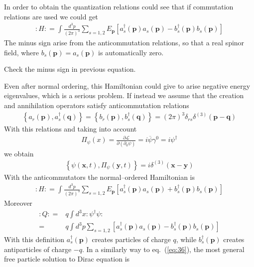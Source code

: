 \begin{frame}
In order to obtain the quantization relations could see that if commutation relations are used we could get
\begin{align}
  \colon\!H\colon=\int\frac{d^3p}{(2\pi)^3}\sum_{s=1,2}E_{\mathbf{p}}\left[a^\dagger_s(\mathbf{p})a_s(\mathbf{p})-b^\dagger_s(\mathbf{p})b_s(\mathbf{p})\right]
\end{align}
The minus sign arise from the anticommutation relations, so that a real spinor field, where $b_s(\mathbf{p})=a_s(\mathbf{p})$ is automatically zero.
\begin{inprogress}
  Check the minus sign in previous equation.
\end{inprogress}
Even after normal ordering, this Hamiltonian could give to arise negative energy eigenvalues, which is a serious problem. If instead we assume that the creation and annihilation operators satisfy anticommutation relations
\begin{align}
  \left\{a_r(\mathbf{p}),a_s^\dagger(\mathbf{q})\right\}=\left\{b_r(\mathbf{p}),b_s^\dagger(\mathbf{q})\right\}=(2\pi)^3\delta_{r s}\delta^{(3)}(\mathbf{p}-\mathbf{q})
\end{align}
With this relations and taking into account
\begin{align}
  \Pi_\psi(x)=\frac{\partial\mathcal{L}}{\partial(\partial_0\psi)}=i\overline{\psi}\gamma^0=i \psi^\dagger 
\end{align}
we obtain
\begin{align}
  \left\{\psi(\mathbf{x},t),\Pi_\psi(\mathbf{y},t)\right\}=i \delta^{(3)}(\mathbf{x}-\mathbf{y}) 
\end{align}
With the anticommutators the normal--ordered Hamiltonian is
\begin{align}
    \colon\!H\colon=\int\frac{d^3p}{(2\pi)^3}\sum_{s=1,2}E_{\mathbf{p}}\left[a^\dagger_s(\mathbf{p})a_s(\mathbf{p})+b^\dagger_s(\mathbf{p})b_s(\mathbf{p})\right]
\end{align}
Moreover
\begin{align}
    \colon\!Q\colon=&q\int d^3x \colon\!\psi^\dagger\psi\colon\nonumber\\
    =&   q \int d^3p\sum_{s=1,2}\left[a^\dagger_s(\mathbf{p})a_s(\mathbf{p})-b^\dagger_s(\mathbf{p})b_s(\mathbf{p})\right]
\end{align}
With this definition $a^\dagger_s(\mathbf{p})$ creates particles of charge $q$, while $b^\dagger_s(\mathbf{p})$ creates antiparticles of charge $-q$.
In a similarly way to eq.~(\ref{eq:36}), the most general free particle solution to Dirac equation is

\end{frame}
